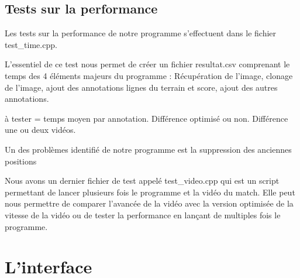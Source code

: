 \subsection{Tests sur la performance}

Les tests sur la performance de notre programme s'effectuent dans le fichier test\_time.cpp.
\bigskip

L'essentiel de ce test nous permet de créer un fichier resultat.csv comprenant le temps des 4 éléments majeurs du programme : Récupération de l'image, clonage de l'image, ajout des annotations lignes du terrain et score, ajout des autres annotations.
\bigskip

à tester = temps moyen par annotation.
Différence optimisé ou non.
Différence une ou deux vidéos.

Un des problèmes identifié de notre programme est la suppression des anciennes positions 
\bigskip

Nous avons un dernier fichier de test appelé test\_video.cpp qui est un script permettant de lancer plusieurs fois le programme et la vidéo du match. Elle peut nous permettre de comparer l'avancée de la vidéo avec la version optimisée de la vitesse de la vidéo ou de tester la performance en lançant de multiples fois le programme.

\section{L'interface}

